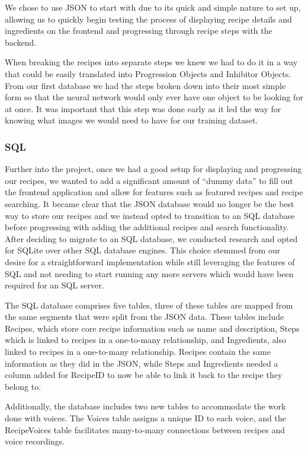 \documentclass{article}
\begin{document}
We chose to use JSON to start with due to its quick and simple nature to set up, allowing us to quickly begin testing the process of displaying recipe details and ingredients on the frontend and progressing through recipe steps with the backend.

When breaking the recipes into separate steps we knew we had to do it in a way that could be easily translated into Progression Objects and Inhibitor Objects. From our first database we had the steps broken down into their most simple form so that the neural network would only ever have one object to be looking for at once. It was important that this step was done early as it led the way for knowing what images we would need to have for our training dataset.
\subsubsection{SQL}
Further into the project, once we had a good setup for displaying and progressing our recipes, we wanted to add a significant amount of “dummy data” to fill out the frontend application and allow for features such as featured recipes and recipe searching. It became clear that the JSON database would no longer be the best way to store our recipes and we instead opted to transition to an SQL database before progressing with adding the additional recipes and search functionality.
After deciding to migrate to an SQL database, we conducted research and opted for SQLite over other SQL database engines. This choice stemmed from our desire for a straightforward implementation while still leveraging the features of SQL and not needing to start running any more servers which would have been required for an SQL server.

The SQL database comprises five tables, three of these tables are mapped from the same segments that were split from the JSON data. These tables include Recipes, which store core recipe information such as name and description, Steps which is linked to recipes in a one-to-many relationship, and Ingredients, also linked to recipes in a one-to-many relationship. Recipes contain the same information as they did in the JSON, while Steps and Ingredients needed a column added for RecipeID to now be able to link it back to the recipe they belong to.

Additionally, the database includes two new tables to accommodate the work done with voices. The Voices table assigns a unique ID to each voice, and the Recipe\textunderscore Voices table facilitates many-to-many connections between recipes and voice recordings.
\end{document}
